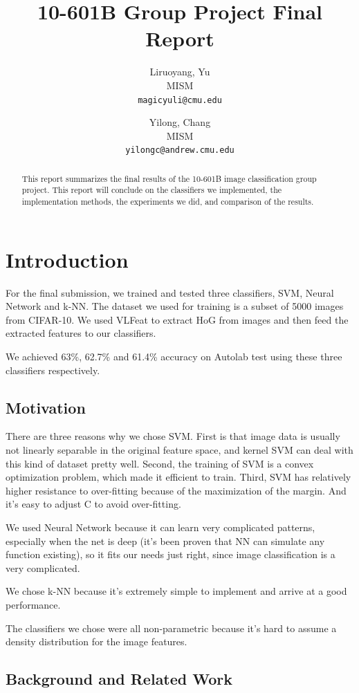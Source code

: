 \documentclass{article} %
\title{10-601B Group Project Final Report}
\author{
Liruoyang, Yu\\
MISM\\
\texttt{magicyuli@cmu.edu}
\and
Yilong, Chang\\
MISM\\
\texttt{yilongc@andrew.cmu.edu}
}
\begin{document}
\maketitle
\begin{abstract}
This report summarizes the final results of the 10-601B image classification group project. This report will conclude on the classifiers we implemented, the implementation methods, the experiments we did, and comparison of the results.
\end{abstract}

\section{Introduction}
For the final submission, we trained and tested three classifiers, SVM,  Neural Network and k-NN. The dataset we used for training is a subset of 5000 images from CIFAR-10. We used VLFeat to extract HoG from images and then feed the extracted features to our classifiers.

We achieved 63\%, 62.7\% and 61.4\% accuracy on Autolab test using these three classifiers respectively.

\subsection{Motivation}

There are three reasons why we chose SVM. First is that image data is usually not linearly separable in the original feature space, and kernel SVM can deal with this kind of dataset pretty well. Second, the training of SVM is a convex optimization problem, which made it efficient to train. Third, SVM has relatively higher resistance to over-fitting because of the maximization of the margin. And it's easy to adjust C to avoid over-fitting.

We used Neural Network because it can learn very complicated patterns, especially when the net is deep (it's been proven that NN can simulate any function existing), so it fits our needs just right, since image classification is a very complicated.

We chose k-NN because it's extremely simple to implement and arrive at a good performance.

The classifiers we chose were all non-parametric because it's hard to assume a density distribution for the image features.

\subsection{Background and Related Work}
\end{document}
